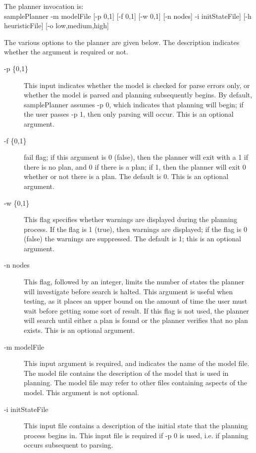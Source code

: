 The planner invocation is:\\
samplePlanner -m modelFile [-p {0,1}] [-f {0,1}] [-w {0,1}] [-n nodes] -i initStateFile] [-h heuristicFile] [-o {low,medium,high}] 

The various options to the planner are given below.  The description indicates whether the
argument is required or not.

\begin{description}
    \item[-p \{0,1\}] This input indicates whether the model is checked for parse errors only,
    or whether the model is parsed and planning subsequently begins.  By default, samplePlanner
    assumes -p 0, which indicates that planning will begin; if the user passes -p 1, then
    only parsing will occur.  This is an optional argument.

    \item[-f \{0,1\}] fail flag; if this argument is 0 (false), then the planner will
    exit with a 1 if there is no plan, and 0 if there is a plan; if 1, then the planner
    will exit 0 whether or not there is a plan.  The default is 0.  This is an optional
    argument.

    \item[-w \{0,1\}] This flag specifies whether warnings are
    displayed during the planning process.  If the flag is 1
    (true), then warnings are displayed; if the flag is 0 (false)
    the warnings are suppressed.  The default is 1; this is an
    optional argument.

    \item[-n nodes]  This flag, followed by an integer, limits the number of states
    the planner will investigate before search is halted.  This argument is useful
    when testing, as it places an upper bound on the amount of time the user must wait
    before getting some sort of result.  If this flag is not used, the planner will search
    until either a plan is found or the planner verifies that no plan exists.  This is
    an optional argument.

    \item[-m modelFile] This input argument is required, and indicates the name of the model
    file.  The model file contains the description of the model that is used in planning.
    The model file may refer to other files containing aspects of the model.
    This argument is not optional.

    \item[-i initStateFile] This input file contains a description of the initial state
    that the planning process begins in.  This input file is required if -p 0 is used, i.e.
    if planning occurs subsequent to parsing.


\end{description}
